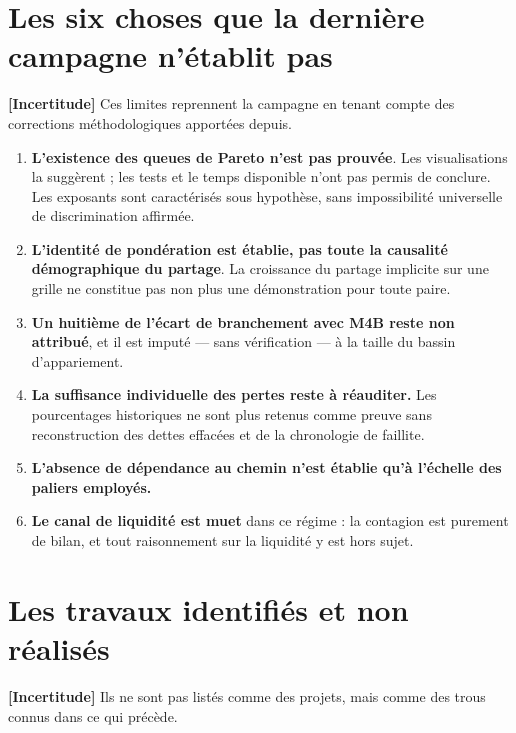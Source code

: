 \documentclass[11pt,a4paper]{article}
\newcommand{\incertitude}{\textbf{[Incertitude]}}
\begin{document}
\section{Les six choses que la dernière campagne n'établit pas}

\incertitude{} Ces limites reprennent la campagne en tenant compte des
corrections méthodologiques apportées depuis.

\begin{enumerate}
\item \textbf{L'existence des queues de Pareto n'est pas prouvée}.
      Les visualisations la suggèrent ; les tests et le temps disponible
      n'ont pas permis de conclure. Les exposants sont caractérisés sous
      hypothèse, sans impossibilité universelle de discrimination affirmée.
\item \textbf{L'identité de pondération est établie, pas toute la causalité
      démographique du partage}. La croissance du partage implicite sur une
      grille ne constitue pas non plus une démonstration pour toute paire.
\item \textbf{Un huitième de l'écart de branchement avec M4B reste non
      attribué}, et il est imputé --- sans vérification --- à la taille du
      bassin d'appariement.
\item \textbf{La suffisance individuelle des pertes reste à réauditer.}
      Les pourcentages historiques ne sont plus retenus comme preuve sans
      reconstruction des dettes effacées et de la chronologie de faillite.
\item \textbf{L'absence de dépendance au chemin n'est établie qu'à l'échelle
      des paliers employés.}
\item \textbf{Le canal de liquidité est muet} dans ce régime : la contagion est
      purement de bilan, et tout raisonnement sur la liquidité y est hors sujet.
\end{enumerate}

\section{Les travaux identifiés et non réalisés}

\incertitude{} Ils ne sont pas listés comme des projets, mais comme des trous
connus dans ce qui précède.
\end{document}

